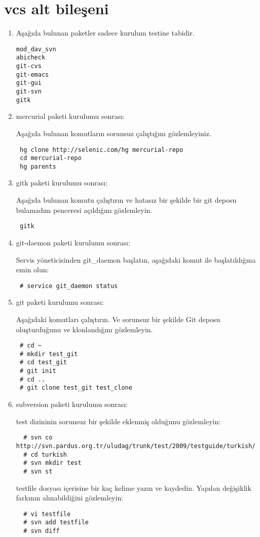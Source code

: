 \documentclass[a4paper,10pt]{article}
\begin{document}
\section{vcs alt bileşeni}
\begin{enumerate}
\item Aşağıda bulunan paketler sadece kurulum testine tabidir.
\begin{verbatim}
mod_dav_svn
abicheck
git-cvs
git-emacs
git-gui
git-svn
gitk
\end{verbatim}
\item mercurial paketi kurulumu sonrası:

Aşağıda bulunan komutların sorunsuz çalıştığını gözlemleyiniz.
\begin{verbatim}
 hg clone http://selenic.com/hg mercurial-repo
 cd mercurial-repo
 hg parents
\end{verbatim}


\item gitk paketi kurulumu sonrası:

Aşağıda bulunan komutu çalıştırın ve hatasız bir şekilde bir git deposu bulamadım penceresi açıldığını gözlemleyin.
\begin{verbatim}
 gitk 
\end{verbatim}

\item git-daemon paketi kurulumu sonrası:

Servis yöneticisinden git\_daemon başlatın, aşağıdaki komut ile başlatıldığına emin olun:
\begin{verbatim}
 # service git_daemon status
\end{verbatim}

\item git paketi kurulumu sonrası:

Aşağıdaki komutları çalıştırın. Ve sorunsuz bir şekilde Git deposu oluşturduğunu ve klonlandığını gözlemleyin.
\begin{verbatim}
 # cd ~
 # mkdir test_git
 # cd test_git
 # git init
 # cd ..
 # git clone test_git test_clone
\end{verbatim}

\item subversion paketi kurulumu sonrası:

test dizininin sorunsuz bir şekilde eklenmiş olduğunu gözlemleyin:
\begin{verbatim}
  # svn co http://svn.pardus.org.tr/uludag/trunk/test/2009/testguide/turkish/
  # cd turkish
  # svn mkdir test
  # svn st
 \end{verbatim}
testfile dosyası içerisine bir kaç kelime yazın ve kaydedin. Yapılan değişiklik farkının alınabildiğini gözlemleyin:
\begin{verbatim}
  # vi testfile
  # svn add testfile
  # svn diff
 \end{verbatim}
\end{enumerate}
\end{document}
